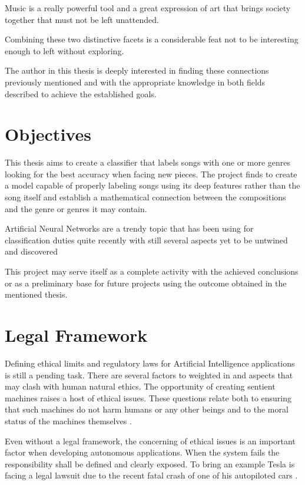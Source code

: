 Music is a really powerful tool and a great expression of art that brings society together that must not be left unattended.

Combining these two distinctive facets is a considerable feat not to be interesting enough to left without exploring.

The author in this thesis is deeply interested in finding these connections previously mentioned and with the appropriate knowledge in both fields described to achieve the established goals.
\newpage

\section{Objectives}
This thesis aims to create a classifier that labels songs with one or more genres looking for the best accuracy when facing new pieces. The project finds to create a model capable of properly labeling songs using its deep features rather than the song itself and establish a mathematical connection between the compositions and the genre or genres it may contain.

Artificial Neural Networks are a trendy topic that has been using for classification duties quite recently with still several aspects yet to be untwined and discovered

This project may serve itself as a complete activity with the achieved conclusions or as a preliminary base for future projects using the outcome obtained in the mentioned thesis.

\newpage
\section{Legal Framework}
Defining ethical limits and regulatory laws for Artificial Intelligence applications is still a pending task.
There are several factors to weighted in and aspects that may clash with human natural ethics.
The opportunity of creating sentient machines raises a host of ethical issues. 
These questions relate both to ensuring that such machines do not harm humans or any other beings and to the moral status of the machines themselves \cite{Bostrom2011}. 


Even without a legal framework, the concerning of ethical issues is an important factor when developing autonomous applications.
When the system fails the responsibility shall be defined and clearly exposed. 
To bring an example Tesla is facing a legal lawsuit due to the recent fatal crash of one of his autopiloted cars \cite{tesla}.


